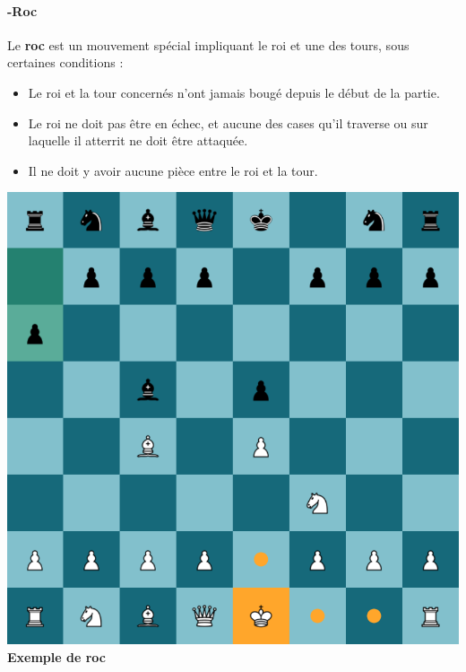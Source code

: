 \documentclass{article}
\begin{document}
\paragraph{-Roc} Le \textbf{roc} est un mouvement spécial impliquant le roi et une des tours, sous certaines conditions :
\begin{itemize}
    \item Le roi et la tour concernés n'ont jamais bougé depuis le début de la partie.
    \item Le roi ne doit pas être en échec, et aucune des cases qu'il traverse ou sur laquelle il atterrit ne doit être attaquée.
    \item Il ne doit y avoir aucune pièce entre le roi et la tour.
\end{itemize}

\noindent
\begin{minipage}{0.48\textwidth}
    \centering
    \includegraphics[width=\textwidth, height=\textwidth]{roc1.png}
    \vspace{0.5cm}
   \textbf{Exemple de roc}
\end{minipage}
\hfill
\end{document}

